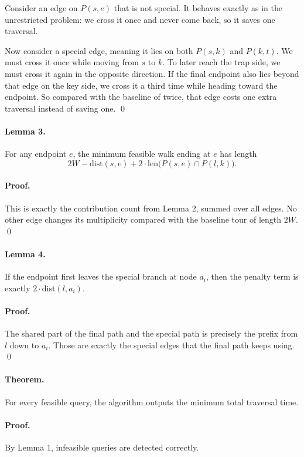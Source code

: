 \documentclass[11pt]{article}
\begin{document}
Consider an edge on $P(s,e)$ that is not special. It behaves exactly as in the unrestricted problem: we
cross it once and never come back, so it saves one traversal.

Now consider a special edge, meaning it lies on both $P(s,k)$ and $P(k,t)$. We must cross it once while
moving from $s$ to $k$. To later reach the trap side, we must cross it again in the opposite direction.
If the final endpoint also lies beyond that edge on the key side, we cross it a third time while heading
toward the endpoint. So compared with the baseline of twice, that edge costs one extra traversal instead of
saving one. \qed

\paragraph{Lemma 3.}
For any endpoint $e$, the minimum feasible walk ending at $e$ has length
\[
    2W - \mathrm{dist}(s,e) + 2 \cdot \mathrm{len}\bigl(P(s,e) \cap P(l,k)\bigr).
\]

\paragraph{Proof.}
This is exactly the contribution count from Lemma 2, summed over all edges. No other edge changes its
multiplicity compared with the baseline tour of length $2W$. \qed

\paragraph{Lemma 4.}
If the endpoint first leaves the special branch at node $a_i$, then the penalty term is exactly
$2 \cdot \mathrm{dist}(l,a_i)$.

\paragraph{Proof.}
The shared part of the final path and the special path is precisely the prefix from $l$ down to $a_i$.
Those are exactly the special edges that the final path keeps using. \qed

\paragraph{Theorem.}
For every feasible query, the algorithm outputs the minimum total traversal time.

\paragraph{Proof.}
By Lemma 1, infeasible queries are detected correctly.
\end{document}
